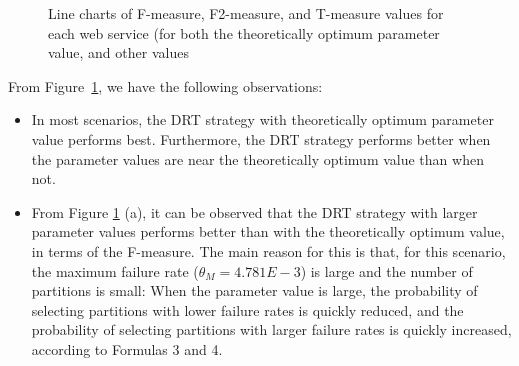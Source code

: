 \documentclass[10pt,journal,compsoc]{IEEEtran}
\begin{document}
\begin{figure}[htbp]
	\caption{Line charts of F-measure, F2-measure, and T-measure values for each web service (for both the theoretically optimum parameter value, and other values}
	\label{fig:theovsnontheo}
\end{figure}


From Figure~\ref{fig:theovsnontheo}, we have the following observations:
\begin{itemize}
  \item
  In most scenarios, the DRT strategy with theoretically optimum parameter value performs best.
  Furthermore, the DRT strategy performs better when the parameter values are near the theoretically optimum value than when not.

  \item
  From Figure \ref{fig:theovsnontheo} (a), it can be observed that the DRT strategy with larger parameter values performs better than with the theoretically optimum value, in terms of the F-measure.
  The main reason for this is that, for this scenario, the maximum failure rate ($\theta_M = 4.781E-3$) is large and the number of partitions is small:
  When the parameter value is large, the probability of selecting partitions with lower failure rates is quickly reduced, and the probability of selecting partitions with larger failure rates is quickly increased, according to Formulas 3 and 4.

\end{itemize}
\end{document}
